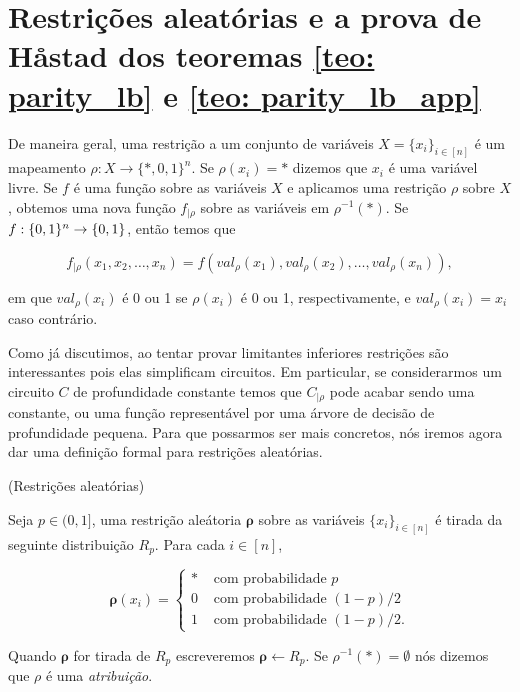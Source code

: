 \section{Restrições aleatórias e a prova de H{\aa}stad dos teoremas \ref{teo: parity_lb} e \ref{teo: parity_lb_app}} \label{section_hastad_proofs}

De maneira geral, uma restrição a um conjunto de variáveis $X = \{x_{i}\}_{i \in [n]}$ é um mapeamento $\rho: X \to \{*, 0, 1\}^{n}$. Se $\rho(x_{i}) = *$ dizemos que $x_{i}$ é uma variável livre. Se $f$ é uma função sobre as variáveis $X$ e aplicamos uma restrição $\rho$ sobre $X$, obtemos uma nova função $f_{\lvert \rho}$ sobre as variáveis em $\rho^{-1}(*)$. Se $f: \{0, 1\}^{n} \to \{0, 1\}$, então temos que

\begin{equation*}
    f_{\lvert \rho}(x_{1}, x_{2}, \dots, x_{n}) = f(val_{\rho}(x_{1}), val_{\rho}(x_{2}), \dots, val_{\rho}(x_{n})),
\end{equation*}

em que $val_{\rho}(x_{i})$ é 0 ou 1 se $\rho(x_{i})$ é 0 ou 1, respectivamente, e $val_{\rho}(x_{i}) = x_{i}$ caso contrário. 

Como já discutimos, ao tentar provar limitantes inferiores restrições são interessantes pois elas simplificam circuitos. Em particular, se considerarmos um circuito $C$ de profundidade constante temos que $C_{\lvert \rho}$ pode acabar sendo uma constante, ou uma função representável por uma árvore de decisão de profundidade pequena. Para que possarmos ser mais concretos, nós iremos agora dar uma definição formal para restrições aleatórias.

\begin{defi} (Restrições aleatórias) \label{random_restrictions}

Seja $p \in (0, 1]$, uma restrição aleátoria $\boldsymbol{\rho}$ sobre as variáveis $\{x_{i}\}_{i \in [n]}$ é tirada da seguinte distribuição $R_{p}$. Para cada $i \in [n]$,

\begin{equation*}
	\boldsymbol{\rho}(x_{i}) = \begin{cases}
			* & \text{ com probabilidade } p \\
			0 & \text{ com probabilidade } (1 - p)/2 \\
			1 & \text{ com probabilidade } (1 - p)/2.
		\end{cases}
\end{equation*}

Quando $\boldsymbol{\rho}$ for tirada de $R_{p}$ escreveremos $\boldsymbol{\rho} \leftarrow R_{p}$. Se $\rho^{-1}(*) = \emptyset$ nós dizemos que $\rho$ é uma \emph{atribuição}.

\end{defi}

